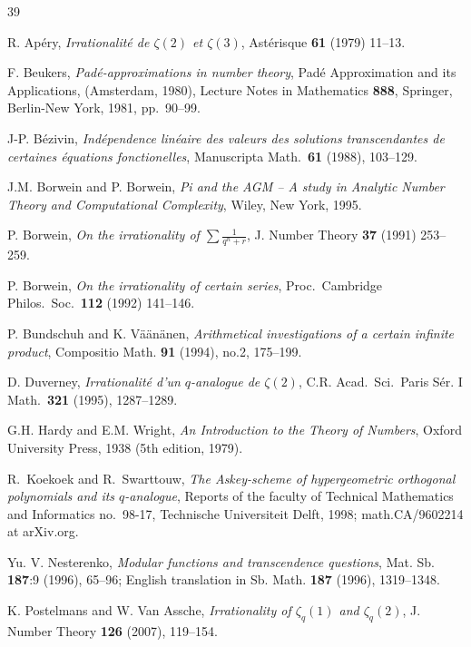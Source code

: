 \documentclass[12pt]{article}
\numberwithin{equation}{section}
\begin{document}
\begin{thebibliography}{39}

 R. Ap\'{e}ry,
\textit{Irrationalit\'{e} de $\zeta(2)$ et $\zeta(3)$},
Ast\'{e}risque \textbf{61} (1979) 11--13.

 F. Beukers,
\textit{Pad\'e-approximations in number theory},
Pad\'e Approximation and its Applications, (Amsterdam, 1980),
Lecture Notes in Mathematics \textbf{888}, Springer, Berlin-New York, 1981, pp.~90--99.

 J-P. B\'{e}zivin,
\textit{Ind\'{e}pendence lin\'{e}aire des valeurs des solutions
transcendantes de certaines \'{e}quations fonctionelles},
Manuscripta Math.\ \textbf{61} (1988), 103--129.

 J.M. Borwein and P. Borwein,
\textit{Pi and the AGM -- A study in Analytic Number Theory and
Computational Complexity}, Wiley, New York, 1995.

 P. Borwein,
\textit{On the irrationality of $\sum\frac{1}{q^n+r}$},
J. Number Theory \textbf{37} (1991) 253--259.

 P. Borwein,
\textit{On the irrationality of certain series},
Proc.\ Cambridge Philos.\ Soc.\ \textbf{112} (1992) 141--146.

 P. Bundschuh and K. V\"{a}\"{a}n\"{a}nen,
\textit{Arithmetical investigations of a certain infinite
product}, Compositio Math. \textbf{91} (1994), no.2, 175--199.

 D. Duverney,
\textit{Irrationalit\'{e} d'un $q$-analogue de $\zeta(2)$},
C.R. Acad.\ Sci.\ Paris S\'{e}r. I Math.\ \textbf{321} (1995), 1287--1289.

 G.H. Hardy and E.M. Wright,
\textit{An Introduction to the Theory of Numbers}, Oxford
University Press, 1938 (5th edition, 1979).

R.~Koekoek and R.~Swarttouw,
\textit{The Askey-scheme of
hypergeometric orthogonal polynomials and its $q$-analogue},
Reports of the faculty of Technical Mathematics and Informatics
no.~98-17, Technische Universiteit Delft, 1998; math.CA/9602214 at
arXiv.org.

 Yu. V. Nesterenko, \textit{Modular functions and
transcendence questions}, Mat. Sb. \textbf{187}:9 (1996), 65--96;
English translation in Sb. Math. \textbf{187} (1996), 1319--1348.

 K. Postelmans and W. Van Assche,
\textit{Irrationality of $\zeta_q(1)$ and $\zeta_q(2)$}, J. Number
Theory \textbf{126} (2007), 119--154.


\end{thebibliography}
\end{document}
